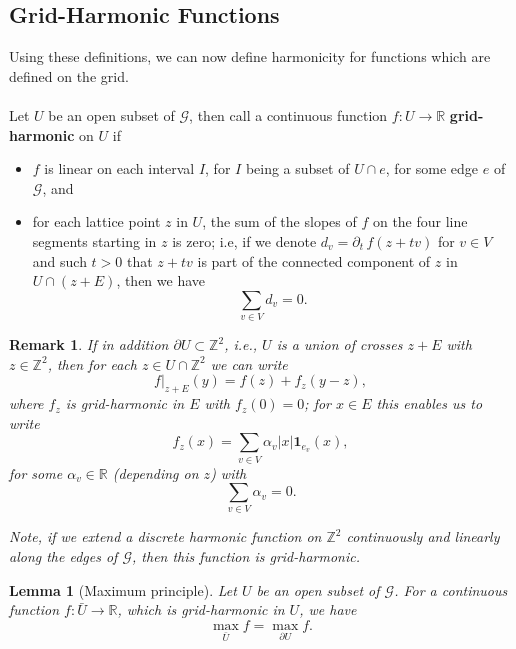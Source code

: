 \documentclass[11pt]{article}
\numberwithin{equation}{section}
\def\indicator{\boldsymbol{1}}
\newtheorem{lemma}[theorem]{Lemma}
\newtheorem*{remark}{Remark}
\begin{document}
\subsection{Grid-Harmonic Functions} 
\label{sec: grid-harmonic functions}
Using these definitions, we can 
now define harmonicity for functions which are defined on the grid.\\~\\
Let $U$ be an open subset of $\mathcal{G}$, then 
call a continuous function $f : U \rightarrow \mathbb{R}$ 
\textbf{grid-harmonic} on $U$ if
\begin{itemize}
  \item   $f$ is linear on each interval $I$, for $I$ being a 
    subset of $U \cap e$, for some edge $e$ of $\mathcal{G}$,
    and
  \item for each lattice point $z$ in $U$,
    the sum of the slopes of $f$ on the four  
      line segments starting in $z$ is zero; 
      i.e, if we denote $d_v = \partial_t \, f(z+tv)$ 
      for $v \in V$ and such $t>0$
      that $z+tv$ is part of the connected component of 
      $z$ in $U \cap (z+E)$, then we have 
      $$
      \sum_{v \in V} d_v = 0.
      $$
\end{itemize}

\begin{remark}
  If in addition
  $\partial U \subset \mathbb{Z}^2$, 
  i.e., $U$ is a union of crosses $z+E$ with 
  $z \in \mathbb{Z}^2$, 
  then for each $z \in U \cap \mathbb{Z}^2$ we can write 
  \begin{equation}\label{eq: representation of f}
    \left.f\right|_{z+E}(y) = f(z) + f_z(y-z),
  \end{equation}
  where $f_z$ is grid-harmonic in $E$ with $f_z(0) = 0$; 
  for $x \in E$ this enables us to write 
  \begin{equation}\label{eq: representation of f_z}
    f_z(x) = \sum_{v \in V} 
      \alpha_v |x| \indicator_{e_v}(x),
  \end{equation} 
  for some $\alpha_v \in \mathbb{R}$ (depending on $z$) with 
  \begin{equation}\nonumber
    \sum_{v \in V} \alpha_v = 0.
  \end{equation}

  Note, if we extend a discrete harmonic function  
  on $\mathbb{Z}^2$ continuously and 
  linearly along the edges of 
  $\mathcal{G}$, then this 
  function is grid-harmonic. 
\end{remark}

\begin{lemma}[Maximum principle]
  \label{L: maximum principle grid}
  Let $U$ be an open subset of $\mathcal{G}$. 
  For a continuous function $f: \bar{U} \rightarrow \mathbb{R}$, 
  which is grid-harmonic in $U$, we have
  \begin{equation}\nonumber
    \max_{\bar{U}} f = \max_{\partial U} f.
  \end{equation} 
\end{lemma}
\end{document}
